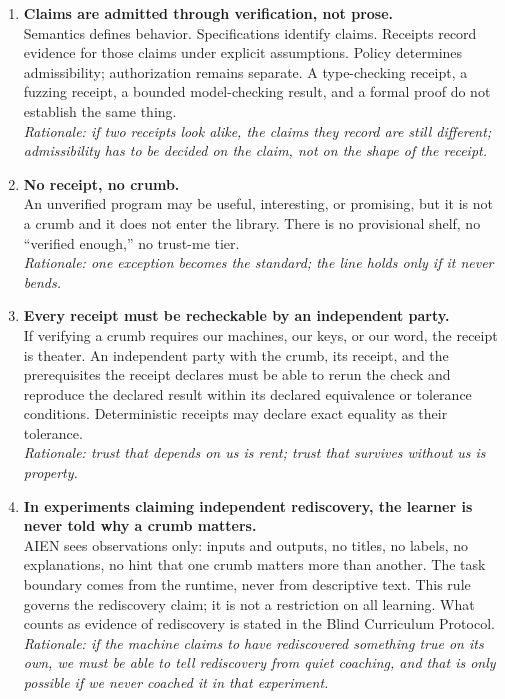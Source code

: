 \documentclass[11pt]{article}
\begin{document}
\begin{enumerate}[leftmargin=*,itemsep=0.8em]

\item \textbf{Claims are admitted through verification, not prose.} \\
Semantics defines behavior. Specifications identify claims. Receipts record evidence for those claims under explicit assumptions. Policy determines admissibility; authorization remains separate. A type-checking receipt, a fuzzing receipt, a bounded model-checking result, and a formal proof do not establish the same thing. \\
\textit{Rationale: if two receipts look alike, the claims they record are still different; admissibility has to be decided on the claim, not on the shape of the receipt.}

\item \textbf{No receipt, no crumb.} \\
An unverified program may be useful, interesting, or promising, but it is not a crumb and it does not enter the library. There is no provisional shelf, no ``verified enough,'' no trust-me tier. \\
\textit{Rationale: one exception becomes the standard; the line holds only if it never bends.}

\item \textbf{Every receipt must be recheckable by an independent party.} \\
If verifying a crumb requires our machines, our keys, or our word, the receipt is theater. An independent party with the crumb, its receipt, and the prerequisites the receipt declares must be able to rerun the check and reproduce the declared result within its declared equivalence or tolerance conditions. Deterministic receipts may declare exact equality as their tolerance. \\
\textit{Rationale: trust that depends on us is rent; trust that survives without us is property.}

\item \textbf{In experiments claiming independent rediscovery, the learner is never told why a crumb matters.} \\
AIEN sees observations only: inputs and outputs, no titles, no labels, no explanations, no hint that one crumb matters more than another. The task boundary comes from the runtime, never from descriptive text. This rule governs the rediscovery claim; it is not a restriction on all learning. What counts as evidence of rediscovery is stated in the Blind Curriculum Protocol. \\
\textit{Rationale: if the machine claims to have rediscovered something true on its own, we must be able to tell rediscovery from quiet coaching, and that is only possible if we never coached it in that experiment.}


\end{enumerate}
\end{document}
